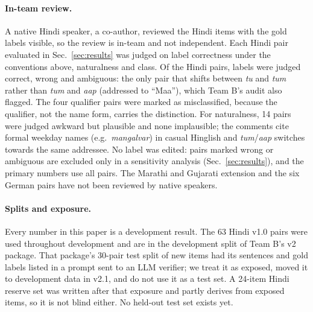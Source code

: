 \paragraph{In-team review.} A native Hindi speaker, a co-author, reviewed the Hindi items with the gold labels visible, so the review is
in-team and not independent. Each Hindi pair evaluated in Sec.~\ref{sec:results} was judged on label correctness under
the conventions above, naturalness and class. Of the \ReviewHiPairsTotal{} Hindi pairs, \ReviewHiPairsCorrect{} labels were judged
correct, \ReviewHiPairsWrong{} wrong and \ReviewHiPairsAmbiguous{} ambiguous: the only pair that shifts between \emph{tu} and \emph{tum}
rather than \emph{tum} and \emph{aap} (addressed to ``Maa''), which Team B's audit also flagged. The four qualifier pairs were marked as
misclassified, because the qualifier, not the name form, carries the distinction. For naturalness, 14 pairs were judged awkward but
plausible and none implausible; the comments cite formal weekday names (e.g.\ \emph{mangalvar}) in casual Hinglish and \emph{tum}/\emph{aap}
switches towards the same addressee. No label was edited: pairs marked wrong or ambiguous are excluded only in a sensitivity analysis
(Sec.~\ref{sec:results}), and the primary numbers use all pairs. The Marathi and Gujarati extension and the six German pairs have not
been reviewed by native speakers.

\paragraph{Splits and exposure.} Every number in this paper is a development result. The 63 Hindi v1.0 pairs were used throughout
development and are in the development split of Team B's v2 package. That package's 30-pair test split of new items had its sentences
and gold labels listed in a prompt sent to an LLM verifier; we treat it as exposed, moved it to development data in v2.1, and do not use
it as a test set. A 24-item Hindi reserve set was written after that exposure and partly derives from exposed items, so it is not blind
either. No held-out test set exists yet.
